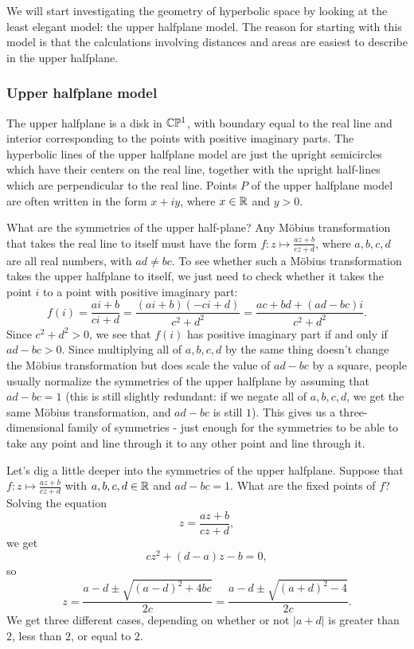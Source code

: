 We will start investigating the geometry of hyperbolic space by looking at the least elegant model: the upper halfplane model. The reason for starting with this model is that the calculations involving distances and areas are easiest to describe in the upper halfplane.

\subsubsection{Upper halfplane model}

The upper halfplane is a disk in $\mathbb{C}\mathbb{P}^1$, with boundary equal to the real line and interior corresponding to the points with positive imaginary parts. The hyperbolic lines of the upper halfplane model are just the upright semicircles which have their centers on the real line, together with the upright half-lines which are perpendicular to the real line. Points $P$ of the upper halfplane model are often written in the form $x + iy$, where $x \in \mathbb{R}$ and $y > 0$.

What are the symmetries of the upper half-plane? Any M\"obius transformation that takes the real line to itself must have the form $f : z \mapsto \frac{az + b}{cz + d}$, where $a,b,c,d$ are all real numbers, with $ad \ne bc$. To see whether such a M\"obius transformation takes the upper halfplane to itself, we just need to check whether it takes the point $i$ to a point with positive imaginary part:
\[
f(i) = \frac{ai+b}{ci+d} = \frac{(ai+b)(-ci+d)}{c^2+d^2} = \frac{ac+bd + (ad - bc)i}{c^2 + d^2}.
\]
Since $c^2 + d^2 > 0$, we see that $f(i)$ has positive imaginary part if and only if $ad - bc > 0$. Since multiplying all of $a,b,c,d$ by the same thing doesn't change the M\"obius transformation but does scale the value of $ad - bc$ by a square, people usually normalize the symmetries of the upper halfplane by assuming that $ad - bc = 1$ (this is still slightly redundant: if we negate all of $a,b,c,d$, we get the same M\"obius transformation, and $ad - bc$ is still $1$). This gives us a three-dimensional family of symmetries - just enough for the symmetries to be able to take any point and line through it to any other point and line through it.

Let's dig a little deeper into the symmetries of the upper halfplane. Suppose that $f : z \mapsto \frac{az + b}{cz + d}$ with $a,b,c,d \in \mathbb{R}$ and $ad - bc = 1$. What are the fixed points of $f$? Solving the equation
\[
z = \frac{az+b}{cz+d},
\]
we get
\[
cz^2 + (d-a)z - b = 0,
\]
so
\[
z = \frac{a-d \pm \sqrt{(a-d)^2 + 4bc}}{2c} = \frac{a-d \pm \sqrt{(a+d)^2 - 4}}{2c}.
\]
We get three different cases, depending on whether or not $|a+d|$ is greater than $2$, less than $2$, or equal to $2$.

